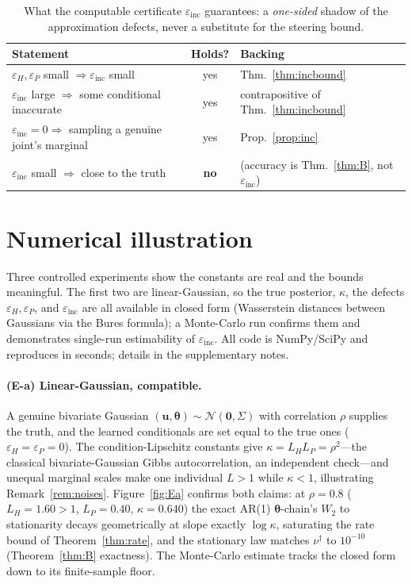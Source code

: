 \documentclass[11pt]{article}
\theoremstyle{plain}
\theoremstyle{definition}
\theoremstyle{remark}
\newcommand{\Normal}{\mathcal{N}}
\newcommand{\bth}{\bm{\theta}}
\newcommand{\bu}{\bm{u}}
\newcommand{\einc}{\varepsilon_{\mathrm{inc}}}
\begin{document}
\begin{table}[h]
\centering
\begin{tabular}{@{}lcl@{}}
\toprule
Statement & Holds? & Backing \\
\midrule
$\varepsilon_H,\varepsilon_P$ small $\Rightarrow \einc$ small & yes & Thm.~\ref{thm:incbound} \\
$\einc$ large $\Rightarrow$ some conditional inaccurate & yes & contrapositive of Thm.~\ref{thm:incbound} \\
$\einc=0 \Rightarrow$ sampling a genuine joint's marginal & yes & Prop.~\ref{prop:inc} \\
$\einc$ small $\Rightarrow$ close to the truth & \textbf{no} & (accuracy is Thm.~\ref{thm:B}, not $\einc$) \\
\bottomrule
\end{tabular}
\caption{What the computable certificate $\einc$ guarantees: a \emph{one-sided} shadow of the
approximation defects, never a substitute for the steering bound.}
\label{tab:einc}
\end{table}

\section{Numerical illustration}
\label{sec:numerics}

Three controlled experiments show the constants are real and the bounds meaningful. The first two are
linear-Gaussian, so the true posterior, $\kappa$, the defects $\varepsilon_H,\varepsilon_P$, and
$\einc$ are all available in closed form (Wasserstein distances between Gaussians via the Bures
formula); a Monte-Carlo run confirms them and demonstrates single-run estimability of $\einc$. All code
is NumPy/SciPy and reproduces in seconds; details in the supplementary notes.

\paragraph{(E-a) Linear-Gaussian, compatible.}
A genuine bivariate Gaussian $(\bu,\bth)\sim\Normal(\bm0,\Sigma)$ with correlation $\rho$ supplies the
truth, and the learned conditionals are set equal to the true ones ($\varepsilon_H=\varepsilon_P=0$).
The condition-Lipschitz constants give $\kappa=L_HL_P=\rho^2$---the classical bivariate-Gaussian Gibbs
autocorrelation, an independent check---and unequal marginal scales make one individual $L>1$ while
$\kappa<1$, illustrating Remark~\ref{rem:noises}. Figure~\ref{fig:Ea} confirms both claims: at
$\rho=0.8$ ($L_H=1.60>1$, $L_P=0.40$, $\kappa=0.640$) the exact AR(1) $\bth$-chain's $W_2$ to
stationarity decays geometrically at slope exactly $\log\kappa$, saturating the rate bound of
Theorem~\ref{thm:rate}, and the stationary law matches $\nu^\dagger$ to $10^{-10}$ (Theorem~\ref{thm:B}
exactness). The Monte-Carlo estimate tracks the closed form down to its finite-sample floor.
\end{document}
